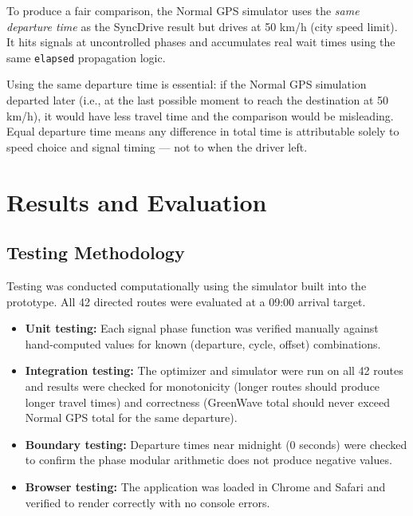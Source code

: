 \documentclass[12pt,a4paper]{report}
\begin{document}
To produce a fair comparison, the Normal GPS simulator uses the \textit{same
departure time} as the SyncDrive result but drives at 50 km/h (city speed
limit). It hits signals at uncontrolled phases and accumulates real wait times
using the same \texttt{elapsed} propagation logic.

Using the same departure time is essential: if the Normal GPS simulation
departed later (i.e., at the last possible moment to reach the destination at
50 km/h), it would have less travel time and the comparison would be
misleading. Equal departure time means any difference in total time is
attributable solely to speed choice and signal timing --- not to when the
driver left.

\chapter{Results and Evaluation}

\section{Testing Methodology}

Testing was conducted computationally using the simulator built into the
prototype. All 42 directed routes were evaluated at a 09:00 arrival target.

\begin{itemize}
  \item \textbf{Unit testing:} Each signal phase function was verified manually
    against hand-computed values for known (departure, cycle, offset)
    combinations.
  \item \textbf{Integration testing:} The optimizer and simulator were run on
    all 42 routes and results were checked for monotonicity (longer routes
    should produce longer travel times) and correctness (GreenWave total should
    never exceed Normal GPS total for the same departure).
  \item \textbf{Boundary testing:} Departure times near midnight (0 seconds)
    were checked to confirm the phase modular arithmetic does not produce
    negative values.
  \item \textbf{Browser testing:} The application was loaded in Chrome and
    Safari and verified to render correctly with no console errors.
\end{itemize}
\end{document}
